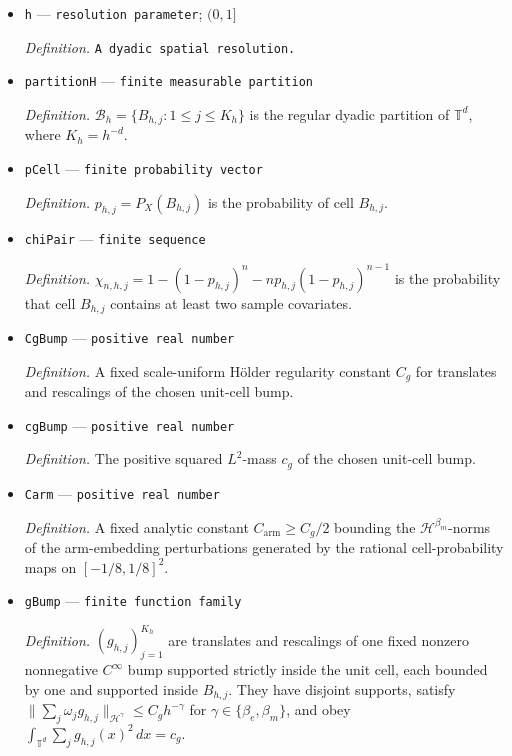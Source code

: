 \documentclass{article}
\begin{document}
\begin{itemize}
  \item \texttt{h} --- \texttt{resolution parameter}; \((0,1]\)
  \par\smallskip\noindent\emph{Definition.} \texttt{A dyadic spatial resolution.}
  \item \texttt{partitionH} --- \texttt{finite measurable partition}
  \par\smallskip\noindent\emph{Definition.} \(\mathcal B_h=\{B_{h,j}:1\le j\le K_h\}\) is the regular dyadic partition of \(\mathbb T^d\), where \(K_h=h^{-d}\).
  \item \texttt{pCell} --- \texttt{finite probability vector}
  \par\smallskip\noindent\emph{Definition.} \(p_{h,j}=P_X(B_{h,j})\) is the probability of cell \(B_{h,j}\).
  \item \texttt{chiPair} --- \texttt{finite sequence}
  \par\smallskip\noindent\emph{Definition.} \(\chi_{n,h,j}=1-(1-p_{h,j})^n-np_{h,j}(1-p_{h,j})^{n-1}\) is the probability that cell \(B_{h,j}\) contains at least two sample covariates.
  \item \texttt{CgBump} --- \texttt{positive real number}
  \par\smallskip\noindent\emph{Definition.} A fixed scale-uniform Hölder regularity constant \(C_g\) for translates and rescalings of the chosen unit-cell bump.
  \item \texttt{cgBump} --- \texttt{positive real number}
  \par\smallskip\noindent\emph{Definition.} The positive squared \(L^2\)-mass \(c_g\) of the chosen unit-cell bump.
  \item \texttt{Carm} --- \texttt{positive real number}
  \par\smallskip\noindent\emph{Definition.} A fixed analytic constant \(C_{\mathrm{arm}}\ge C_g/2\) bounding the \(\mathcal H^{\beta_m}\)-norms of the arm-embedding perturbations generated by the rational cell-probability maps on \([-1/8,1/8]^2\).
  \item \texttt{gBump} --- \texttt{finite function family}
  \par\smallskip\noindent\emph{Definition.} \((g_{h,j})_{j=1}^{K_h}\) are translates and rescalings of one fixed nonzero nonnegative \(C^\infty\) bump supported strictly inside the unit cell, each bounded by one and supported inside \(B_{h,j}\). They have disjoint supports, satisfy \(\|\sum_j\omega_jg_{h,j}\|_{\mathcal H^\gamma}\le C_g h^{-\gamma}\) for \(\gamma\in\{\beta_e,\beta_m\}\), and obey \(\int_{\mathbb T^d}\sum_jg_{h,j}(x)^2\,dx=c_g\).

\end{itemize}
\end{document}
